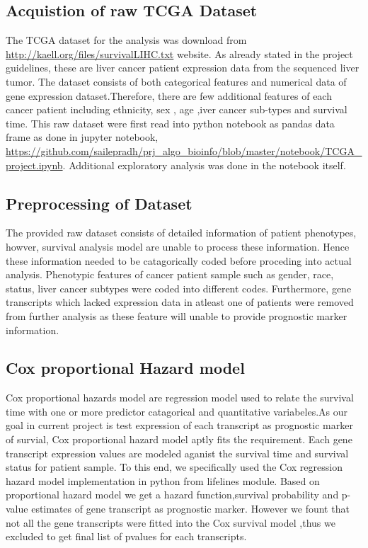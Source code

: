 \documentclass[9pt,twocolumn,twoside]{article}
\begin{document}
	\subsection{Acquistion of raw TCGA Dataset}
The  TCGA dataset for the analysis was download from \url{http://kaell.org/files/survivalLIHC.txt} website. As already stated in the project guidelines, these are liver cancer patient expression data from the sequenced liver tumor. The  dataset consists of both categorical features and numerical data of gene expression dataset.Therefore, there are few additional features of each cancer patient including ethnicity, sex , age ,iver cancer sub-types and survival time. This raw dataset were first read into python notebook as pandas data frame  as done in  jupyter notebook, \url{https://github.com/sailepradh/prj_algo_bioinfo/blob/master/notebook/TCGA_project.ipynb}.  Additional exploratory analysis was done in the notebook itself.

	\subsection {Preprocessing of Dataset}
The provided raw dataset consists of detailed information of patient phenotypes, howver, survival analysis model are unable to process these information. Hence these information needed to be catagorically coded before proceding into actual analysis. Phenotypic features of cancer patient sample such as gender, race, status, liver cancer subtypes were coded into different codes. Furthermore, gene transcripts which lacked expression data in atleast one of patients were removed from further analysis as these feature will unable to provide prognostic marker information.

	\subsection{Cox proportional Hazard model}
	 Cox proportional hazards model are regression model used to relate the survival time with one or more predictor catagorical and quantitative variabeles.As our goal in current project is test expression of each transcript as prognostic marker of survial, Cox proportional hazard model aptly fits the requirement. Each gene transcript expression values are modeled aganist the survival time and survival status for patient sample. To this end, we specifically used the Cox regression hazard model implementation in python from lifelines \cite{lifelines} module. Based on proportional hazard model we get a hazard function,survival probability and p-value estimates of gene transcript as prognostic marker. However we fount that not all the gene transcripts were fitted into the Cox survival model ,thus we excluded to get final list of pvalues for each transcripts.
	 
\end{document}
